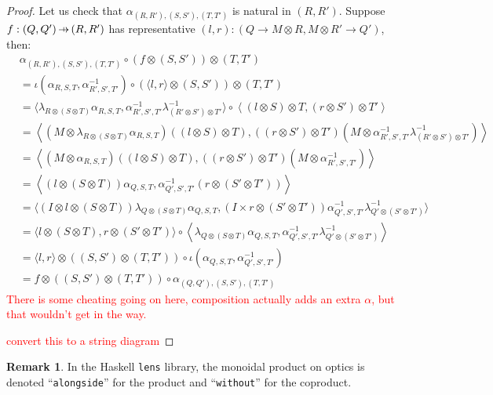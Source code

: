 \documentclass[11pt,a4paper]{article}
\theoremstyle{plain}
\theoremstyle{definition}
\newtheorem{remark}[theorem]{Remark}
\newcommand{\hto}{\ensuremath{\,\mathaccent\shortmid\rightarrow\,}}
\newcommand{\todo}[1]{\textcolor{red}{\small #1}}
\begin{document}
\begin{proof}
  Let us check that $\alpha_{(R, R'), (S, S'), (T, T')}$ is natural in $(R, R')$. Suppose $f : (Q, Q') \hto (R, R')$ has representative $(l, r) : (Q \to M \otimes R, M \otimes R' \to Q')$, then:
  \begin{align*}
    &\alpha_{(R, R'), (S, S'), (T, T')} \circ (f \otimes (S, S')) \otimes (T, T') \\
    &= \iota(\alpha_{R,S,T}, \alpha_{R',S',T'}^{-1})  \circ (\langle l, r \rangle \otimes (S, S')) \otimes (T, T') \\
    &= \langle\lambda_{R \otimes (S \otimes T)}\alpha_{R,S,T}, \alpha_{R',S',T'}^{-1} \lambda^{-1}_{(R' \otimes S') \otimes T'} \rangle  \circ \left\langle (l \otimes S) \otimes T, (r \otimes S') \otimes T' \right\rangle \\
    &=\left\langle (M \otimes \lambda_{R \otimes (S \otimes T)}\alpha_{R,S,T})((l \otimes S) \otimes T), ((r \otimes S') \otimes T') (M \otimes \alpha_{R',S',T'}^{-1} \lambda^{-1}_{(R' \otimes S') \otimes T'} ) \right\rangle \\
    &=\left\langle (M \otimes \alpha_{R,S,T})((l \otimes S) \otimes T), ((r \otimes S') \otimes T') (M \otimes \alpha_{R',S',T'}^{-1} )\right\rangle \\
    &=\left\langle (l \otimes (S \otimes T))\alpha_{Q,S,T}, \alpha_{Q',S',T'}^{-1}(r \otimes (S' \otimes T')) \right\rangle \\
    &= \langle (I \otimes l \otimes (S \otimes T)) \lambda_{Q \otimes (S \otimes T)}\alpha_{Q,S,T}, (I \times r \otimes (S' \otimes T')) \alpha_{Q',S',T'}^{-1} \lambda^{-1}_{Q' \otimes (S' \otimes T')}\rangle \\
    &= \langle l \otimes (S \otimes T), r \otimes (S' \otimes T')\rangle \circ \left\langle \lambda_{Q \otimes (S \otimes T)}\alpha_{Q,S,T}, \alpha_{Q',S',T'}^{-1} \lambda^{-1}_{Q' \otimes (S' \otimes T')} \right\rangle \\
    &= \langle l, r \rangle \otimes ((S, S') \otimes (T, T')) \circ \iota(\alpha_{Q,S,T}, \alpha_{Q',S',T'}^{-1}) \\
    &= f \otimes ((S, S') \otimes (T, T')) \circ \alpha_{(Q, Q'), (S, S'), (T, T')}
  \end{align*}
  \todo{There is some cheating going on here, composition actually adds an extra $\alpha$, but that wouldn't get in the way.}

  \todo{convert this to a string diagram}
\end{proof}

\begin{remark}
  In the Haskell \texttt{lens} library, the monoidal product on optics is denoted ``\texttt{alongside}'' for the product and ``\texttt{without}'' for the coproduct.
\end{remark}
\end{document}

